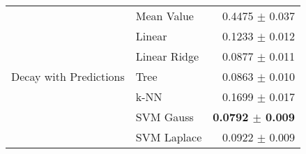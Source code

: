 \documentclass[10pt]{article}
\begin{document}
\begin{table}[H]
\begin{tabular}{llr}
    \hline
    \multirow{7}{*}{Decay with Predictions} & Mean Value   & 0.4475 $\pm$ 0.037 \\
                               & Linear       & 0.1233 $\pm$ 0.012 \\
                               & Linear Ridge & 0.0877 $\pm$ 0.011 \\
                               & Tree         & 0.0863 $\pm$ 0.010 \\
                               & k-NN         & 0.1699 $\pm$ 0.017 \\
                               & SVM Gauss    & \textbf{0.0792 $\pm$ 0.009} \\
                               & SVM Laplace  & 0.0922 $\pm$ 0.009 \\
    \hline\hline
  \end{tabular}
  \label{tab:lumoresults}
\end{table}





\end{document}
